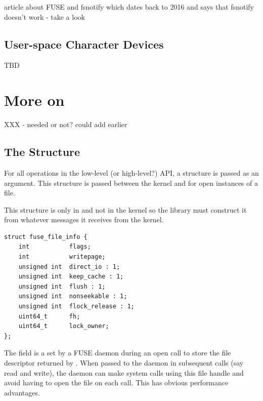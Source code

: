 article about FUSE and fsnotify which dates back to 2016 and says that fsnotify doesn't work - take a look %


\subsection{User-space Character Devices}

TBD


\section{More on }

XXX - needed or not? could add earlier


\subsection{The  Structure}

For all operations in the low-level (or high-level?) API, a  structure is passed as an argument. This structure is passed between the kernel and  for open instances of a file.

This structure is only in  and not in the kernel so the library must construct it from whatever messages it receives from the kernel.

\begin{lstlisting}
struct fuse_file_info {
    int           flags; 
    int           writepage; 
    unsigned int  direct_io : 1;
    unsigned int  keep_cache : 1;
    unsigned int  flush : 1;
    unsigned int  nonseekable : 1;
    unsigned int  flock_release : 1;
    uint64_t      fh; 
    uint64_t      lock_owner;
};
\end{lstlisting}

\noindent
The  field is a  set by a FUSE daemon during an open call to store the file descriptor returned by . When passed to the daemon in subsequent calls (say read and write), the daemon can make system calls using this file handle and avoid having to open the file on each call. This has obvious performance advantages. 

